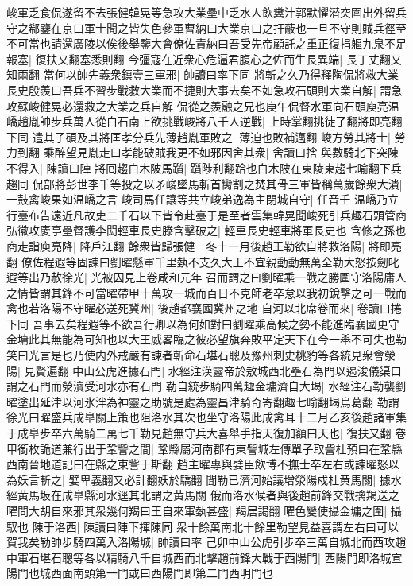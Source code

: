 峻軍乏食侃遂留不去張健韓晃等急攻大業壘中乏水人飲糞汁郭默懼潜突圍出外留兵守之郗鑒在京口軍士聞之皆失色參軍曹納曰大業京口之扞蔽也一旦不守則賊兵徑至不可當也請還廣陵以俟後舉鑒大會僚佐責納曰吾受先帝顧託之重正復捐軀九泉不足報塞|{
	復扶又翻塞悉則翻}
今彊寇在近衆心危逼君腹心之佐而生長異端|{
	長丁丈翻又知兩翻}
當何以帥先義衆鎮壹三軍邪|{
	帥讀曰率下同}
將斬之久乃得釋陶侃將救大業長史殷羨曰吾兵不習步戰救大業而不捷則大事去矣不如急攻石頭則大業自解|{
	謂急攻蘇峻健晃必還救之大業之兵自解}
侃從之羨融之兄也庚午侃督水軍向石頭庾亮温嶠趙胤帥步兵萬人從白石南上欲挑戰峻將八千人逆戰|{
	上時掌翻挑徒了翻將即亮翻下同}
遣其子碩及其將匡孝分兵先薄趙胤軍敗之|{
	薄迫也敗補邁翻}
峻方勞其將士|{
	勞力到翻}
乘醉望見胤走曰孝能破賊我更不如邪因舍其衆|{
	舍讀曰捨}
與數騎北下突陳不得入|{
	陳讀曰陣}
將囘趨白木陂馬躓|{
	躓陟利翻跲也白木陂在東陵東趨七喻翻下兵趨同}
侃部將彭世李千等投之以矛峻墜馬斬首臠割之焚其骨三軍皆稱萬歲餘衆大潰|{
	一鼔禽峻果如温嶠之言}
峻司馬任讓等共立峻弟逸為主閉城自守|{
	任音壬}
温嶠乃立行臺布告遠近凡故吏二千石以下皆令赴臺于是至者雲集韓晃聞峻死引兵趣石頭管商弘徽攻庱亭壘督護李閎輕車長史滕含擊破之|{
	輕車長史輕車將軍長史也}
含修之孫也商走詣庾亮降|{
	降戶江翻}
餘衆皆歸張健　冬十一月後趙王勒欲自將救洛陽|{
	將即亮翻}
僚佐程遐等固諫曰劉曜懸軍千里埶不支久大王不宜親動動無萬全勒大怒按劒叱遐等出乃赦徐光|{
	光被囚見上卷咸和元年}
召而謂之曰劉曜乘一戰之勝圍守洛陽庸人之情皆謂其鋒不可當曜帶甲十萬攻一城而百日不克師老卒怠以我初銳擊之可一戰而禽也若洛陽不守曜必送死冀州|{
	後趙都襄國冀州之地}
自河以北席卷而來|{
	卷讀曰捲下同}
吾事去矣程遐等不欲吾行卿以為何如對曰劉曜乘高候之勢不能進臨襄國更守金墉此其無能為可知也以大王威畧臨之彼必望旗奔敗平定天下在今一舉不可失也勒笑曰光言是也乃使内外戒嚴有諫者斬命石堪石聰及豫州刺史桃豹等各統見衆會滎陽|{
	見賢遍翻}
中山公虎進據石門|{
	水經注漢靈帝於敖城西北壘石為門以遏浚儀渠口謂之石門而滎瀆受河水亦有石門}
勒自統步騎四萬趣金墉濟自大堨|{
	水經注石勒襲劉曜塗出延津以河氷泮為神靈之助號是處為靈昌津騎奇寄翻趣七喻翻堨烏葛翻}
勒謂徐光曰曜盛兵成臯關上策也阻洛水其次也坐守洛陽此成禽耳十二月乙亥後趙諸軍集于成臯步卒六萬騎二萬七千勒見趙無守兵大喜舉手指天復加額曰天也|{
	復扶又翻}
卷甲銜枚詭道兼行出于鞏訾之間|{
	鞏縣屬河南郡有東訾城左傳單子取訾杜預曰在鞏縣西南晉地道記曰在縣之東訾于斯翻}
趙主曜專與嬖臣飲博不撫士卒左右或諫曜怒以為妖言斬之|{
	嬖卑義翻又必計翻妖於驕翻}
聞勒已濟河始議增滎陽戍杜黄馬關|{
	據水經黄馬坂在成臯縣河水逕其北謂之黄馬關}
俄而洛水候者與後趙前鋒交戰擒羯送之曜問大胡自來邪其衆幾何羯曰王自來軍埶甚盛|{
	羯居謁翻}
曜色變使攝金墉之圍|{
	攝馭也}
陳于洛西|{
	陳讀曰陣下揮陳同}
衆十餘萬南北十餘里勒望見益喜謂左右曰可以賀我矣勒帥步騎四萬入洛陽城|{
	帥讀曰率}
己卯中山公虎引步卒三萬自城北而西攻趙中軍石堪石聰等各以精騎八千自城西而北擊趙前鋒大戰于西陽門|{
	西陽門即洛城宣陽門也城西面南頭第一門或曰西陽門即第二門西明門也}
